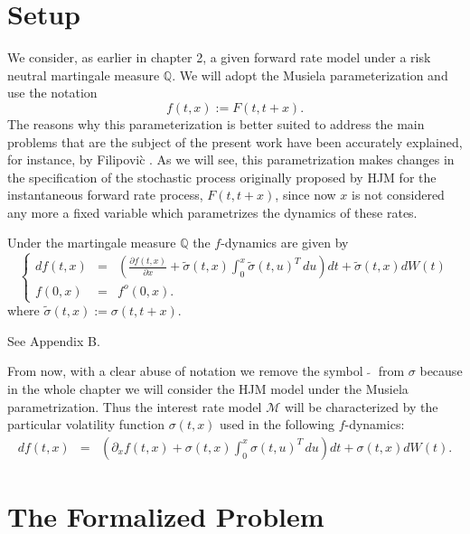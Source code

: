 \section{Setup}
We consider, as earlier in chapter 2, a given forward rate model under a
risk neutral martingale measure $\mathbb{Q}$. We will adopt the
Musiela parameterization \cite{Mu:1993} and use the notation 
$$
f(t,x):=F(t,t+x).
$$
The reasons why this parameterization is better suited to address the
main problems that are the subject of the present work have been
accurately explained, for instance, by Filipovi\`c
\cite{Fil:2001}. As we will see, this parametrization makes changes in
the specification of the stochastic process originally proposed by HJM
for the instantaneous forward rate process, $F(t,t+x)$, since now $x$
is not considered any more a fixed variable which parametrizes the
dynamics of these rates. 
\begin{propos} Under the martingale
  measure $\mathbb{Q}$ the $f$-dynamics are given by
\begin{equation}
\label{HJMM:2}
\left\{
\begin{array}{rcl}
df(t,x)& = & \left( \frac{\partial f(t,x)}{\partial x}+
  \widetilde\sigma(t,x)\displaystyle \int_0^x \widetilde\sigma(t,u)^T
  \,du\right) dt + \widetilde\sigma(t,x)dW (t) \\  
f(0,x) & = & f^o(0,x).
\end{array}
\right.
\end{equation}
where $\widetilde \sigma(t,x):=\sigma(t,t+x)$.
\end{propos}
\begin{demo}
See Appendix B. 
\end{demo} 

From now, with a clear abuse of notation we remove the symbol
$\;\widetilde{}\;$ from $\sigma$ because in the whole chapter we will
consider the HJM model under the Musiela parametrization. Thus the
interest rate model $\mathcal{M}$ will be characterized by the
particular volatility function $\sigma(t,x)$ used in the following
$f$-dynamics:
\begin{equation}
\label{HJMM:3}
\begin{array}{rcl}
df(t,x)& = & \left( \partial_x f(t,x)+
  \sigma(t,x)\displaystyle \int_0^x \sigma(t,u)^T
  \,du\right) dt + \sigma(t,x)dW (t).
\end{array}
\end{equation}
\section{The Formalized Problem}

